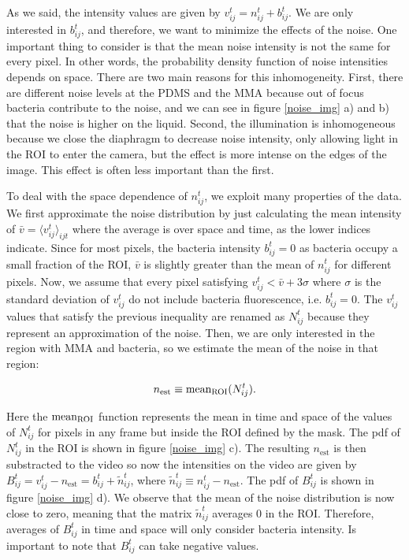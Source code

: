 As we said, the intensity values are given by $v_{ij}^t  = n_{ij}^t +  b_{ij}^t$. We are only interested in $b_{ij}^t$, and therefore, we want to minimize the effects of the noise. One important thing to consider is that the mean noise intensity is not the same for every pixel. In other words, the probability density function of noise intensities depends on space. There are two main reasons for this inhomogeneity. First, there are different noise levels at the PDMS and the MMA because out of focus bacteria contribute to the noise, and we can see in figure \ref{noise_img} a) and b) that the noise is higher on the liquid. Second, the illumination is inhomogeneous because we close the diaphragm to decrease noise intensity, only allowing light in the ROI to enter the camera, but the effect is more intense on the edges of the image. This effect is often less important than the first.

To deal with the space dependence of $n_{ij}^t$, we exploit many properties of the data. We first approximate the noise distribution by just calculating the mean intensity of  $\bar{v} = \langle v_{ij}^t \rangle_{ijt}$ where the average is over space and time, as the lower indices indicate. Since for most pixels, the bacteria intensity $b_{ij}^t=0$ as bacteria occupy a small fraction of the ROI, $\bar{v}$ is slightly greater than the mean of $n_{ij}^t$ for different pixels. Now, we assume that every pixel satisfying $v_{ij}^t  < \bar{v} + 3 \sigma$ where $\sigma$ is the standard deviation of $v_{ij}^t$ do not include bacteria fluorescence, i.e. $b_{ij}^t =0$. The $v_{ij}^t$ values that satisfy the previous inequality are renamed as $N_{ij}^t$ because they represent an approximation of the noise. Then, we are only interested in the region with MMA and bacteria, so we estimate the mean of the noise in that region:

\begin{equation} \label{eq:noise_aproximation}
	n_{\text{est}} \equiv {\rm mean_{ROI}}(N_{ij}^t).
\end{equation}

Here the ${\rm mean_{ROI}}$ function represents the mean in time and space of the values of $N_{ij}^t$ for pixels in any frame but inside the ROI defined by the mask. The pdf of $N_{ij}^t$ in the ROI is shown in figure \ref{noise_img} c). The resulting $n_{\text{est}}$ is then substracted to the video so now the intensities on the video are given by $B_{ij}^t  =  v_{ij}^t - n_{\text{est}} =  b_{ij}^t + \tilde{n}_{ij}^t$, where $\tilde{n}_{ij}^t  \equiv n_{ij}^t - n_{\text{est}}$. The pdf of $B_{ij}^t$ is shown in figure \ref{noise_img} d). We observe that the mean of the noise distribution is now close to zero, meaning that the matrix $\tilde{n}_{ij}^t$ averages 0 in the ROI. Therefore, averages of $B_{ij}^t$ in time and space will only consider bacteria intensity. Is important to note that $B_{ij}^t$ can take negative values.

